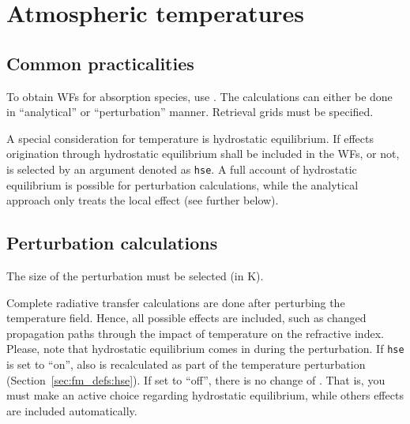 \section{Atmospheric temperatures}
\label{sec:wfuns:atmtemp}

\subsection{Common practicalities}
%
To obtain WFs for absorption species, use .
The calculations can either be done in ``analytical'' or ``perturbation''
manner. Retrieval grids must be specified.

A special consideration for temperature is hydrostatic equilibrium. If effects
origination through hydrostatic equilibrium shall be included in the WFs, or
not, is selected by an argument denoted as \verb|hse|. A full account of
hydrostatic equilibrium is possible for perturbation calculations, while the
analytical approach only treats the local effect (see further below).


\subsection{Perturbation calculations}
%
The size of the perturbation must be selected (in K).

Complete radiative transfer calculations are done after perturbing the
temperature field. Hence, all possible effects are included, such as changed
propagation paths through the impact of temperature on the refractive index.
Please, note that hydrostatic equilibrium comes in during the perturbation. If
\verb|hse| is set to ``on'', also  is recalculated as part
of the temperature perturbation (Section~\ref{sec:fm_defs:hse}). If set to
``off'', there is no change of . That is, you must make an
active choice regarding hydrostatic equilibrium, while others effects are
included automatically.


